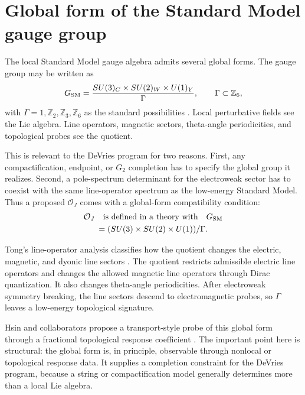 \section{Global form of the Standard Model gauge group}
\label{sec:global-form}

The local Standard Model gauge algebra admits several global forms.  The gauge group may be written as
\begin{equation}
  G_{\rm SM}=\frac{SU(3)_C\times SU(2)_W\times U(1)_Y}{\Gamma},
  \qquad
  \Gamma\subset \mathbb Z_6,
  \label{eq:gsm-global}
\end{equation}
with \(\Gamma=1,\mathbb Z_2,\mathbb Z_3,\mathbb Z_6\) as the standard possibilities \cite{TongLineOperators2017,HsinGomis2024}.  Local perturbative fields see the Lie algebra.  Line operators, magnetic sectors, theta-angle periodicities, and topological probes see the quotient.

This is relevant to the DeVries program for two reasons.  First, any compactification, endpoint, or \(G_2\) completion has to specify the global group it realizes.  Second, a pole-spectrum determinant for the electroweak sector has to coexist with the same line-operator spectrum as the low-energy Standard Model.  Thus a proposed \(\mathcal O_J\) comes with a global-form compatibility condition:
\begin{equation}
  \begin{gathered}
  \mathcal O_J
  \quad\text{is defined in a theory with}\quad
  G_{\rm SM}\\
  =(SU(3)\times SU(2)\times U(1))/\Gamma .
  \end{gathered}
  \label{eq:global-form-compatibility}
\end{equation}

Tong's line-operator analysis classifies how the quotient changes the electric, magnetic, and dyonic line sectors \cite{TongLineOperators2017}.  The quotient restricts admissible electric line operators and changes the allowed magnetic line operators through Dirac quantization.  It also changes theta-angle periodicities.  After electroweak symmetry breaking, the line sectors descend to electromagnetic probes, so \(\Gamma\) leaves a low-energy topological signature.

Hsin and collaborators propose a transport-style probe of this global form through a fractional topological response coefficient \cite{HsinGomis2024}.  The important point here is structural: the global form is, in principle, observable through nonlocal or topological response data.  It supplies a completion constraint for the DeVries program, because a string or compactification model generally determines more than a local Lie algebra.

